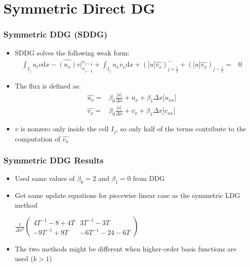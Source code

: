 \documentclass[serif,12pt]{beamer}
\begin{document}
\section{Symmetric Direct DG}
\begin{frame}
\frametitle{Symmetric DDG (SDDG)}
\begin{itemize}
	\item SDDG solves the following weak form:
	\begin{align*}
		\int_{I_j} u_t v \mathrm{d}x -\widehat{(u_x)}v\bigr|_{x_{j-\frac{1}{2}}}^{x_{j+\frac{1}{2}}}+\int_{I_j} u_x v_x \mathrm{d}x+ (\lbrack u\rbrack\widehat{v_x})_{j+\frac{1}{2}}^- + (\lbrack u\rbrack \widehat{v_x} )_{j-\frac{1}{2}} = & 0
	\end{align*}
	\item The flux is defined as:
	\begin{align*}
		\widehat{u_x} = & \beta_0 \frac{\lbrack u \rbrack}{\Delta x} + \overline{u_x} + \beta_1 \Delta x \lbrack u_{xx} \rbrack\\
		\widehat{v_x} = & \beta_0 \frac{\lbrack v \rbrack}{\Delta x} + \overline{v_x} + \beta_1 \Delta x \lbrack v_{xx} \rbrack
	\end{align*}
	\item $v$ is nonzero only inside the cell $I_j$, so only half of the terms contribute to the computation of $\widehat{v_x}$
\end{itemize}
\end{frame}

\begin{frame}
\frametitle{Symmetric DDG Results}
	\begin{itemize}
		\item Used same values of $\beta_0=2$ and $\beta_1=0$ from DDG
		\item Get same update equations for piecewise linear case as the symmetric LDG method\\
		\begin{center}
		$\frac{1}{\Delta x^2}\left(
		\begin{array}{cc}
		4T^{-1} -8+4 T & 3T^{-1}-3 T \\
		 -9 T^{-1} +9 T & -6 T^{-1} -24-6 T
		\end{array}
		\right)$
		\end{center}
		\item The two methods might be different when higher-order basis functions are used ($k>1$)
	\end{itemize}
\end{frame}
\end{document}
